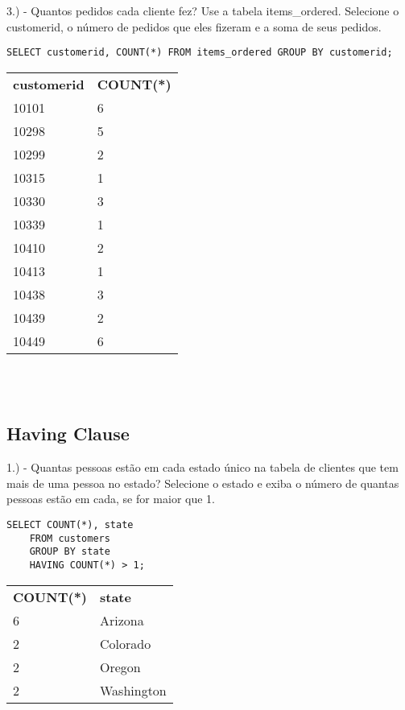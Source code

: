 3.) - Quantos pedidos cada cliente fez? Use a tabela items\_ordered. Selecione o customerid, o número de pedidos que eles fizeram e a soma de seus pedidos.

\begin{lstlisting}
SELECT customerid, COUNT(*) FROM items_ordered GROUP BY customerid;
\end{lstlisting}

\begin{tabular}{l l}
    {\textbf{customerid}} & {\textbf{COUNT(*)}} \\
    {10101}               & {6}                 \\
    {10298}               & {5}                 \\
    {10299}               & {2}                 \\
    {10315}               & {1}                 \\
    {10330}               & {3}                 \\
    {10339}               & {1}                 \\
    {10410}               & {2}                 \\
    {10413}               & {1}                 \\
    {10438}               & {3}                 \\
    {10439}               & {2}                 \\
    {10449}               & {6}                
\end{tabular} \\ \\

\newpage

\subsection{Having Clause}

1.) - Quantas pessoas estão em cada estado único na tabela de clientes que tem mais de uma pessoa no estado? Selecione o estado e exiba o número de quantas pessoas estão em cada, se for maior que 1.

\begin{lstlisting}
SELECT COUNT(*), state 
	FROM customers
	GROUP BY state
	HAVING COUNT(*) > 1;
\end{lstlisting}

\begin{tabular}{ll}
    {\textbf{COUNT(*)}} & \textbf{state} \\
    {6}                 & Arizona        \\
    {2}                 & Colorado       \\
    {2}                 & Oregon         \\
    {2}                 & Washington    
\end{tabular} \\ \\



